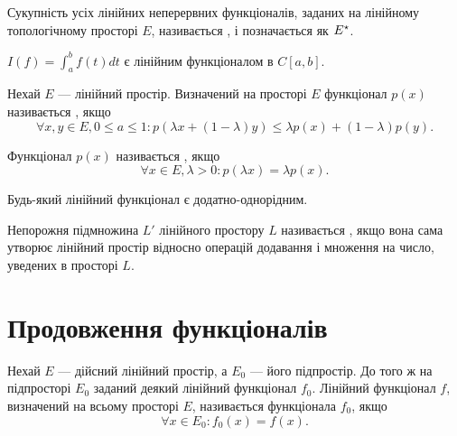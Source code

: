 \begin{definition}
Сукупність усіх лінійних неперервних
функціоналів, заданих на лінійному топологічному
просторі $E$, називається , і
позначається як $E^\star$.
\end{definition}

\begin{example}
$I(f) = \int_a^b f(t) dt$ є лінійним функціоналом в $C[a, b]$.
\end{example}

\begin{definition}
Нехай $E$ --- лінійний простір. Визначений на
просторі $E$ функціонал $p(x)$ називається , якщо
\begin{equation*}
    \forall x, y \in E, 0 \le a \le 1:
    p(\lambda x + (1 - \lambda) y) \le \lambda p(x) + (1 - \lambda) p(y).
\end{equation*}
\end{definition}

\begin{definition}
Функціонал $p(x)$ називається , якщо
\begin{equation*}
    \forall x \in E, \lambda > 0: p(\lambda x) = \lambda p(x).
\end{equation*}
\end{definition}

\begin{example}
Будь-який лінійний функціонал є додатно-однорідним.
\end{example}

\begin{definition}
Непорожня підмножина $L'$ лінійного простору
$L$ називається , якщо вона сама
утворює лінійний простір відносно операцій додавання і
множення на число, уведених в просторі $L$.
\end{definition}

\section{Продовження функціоналів}

\begin{definition}
Нехай $E$ --- дійсний лінійний простір, а $E_0$ ---
його підпростір. До того ж на підпросторі $E_0$ заданий
деякий лінійний функціонал $f_0$. Лінійний функціонал $f$,
визначений на всьому просторі $E$, називається
 функціонала $f_0$, якщо 
\begin{equation*}
    \forall x \in E_0: f_0(x) = f(x).
\end{equation*}
\end{definition}

